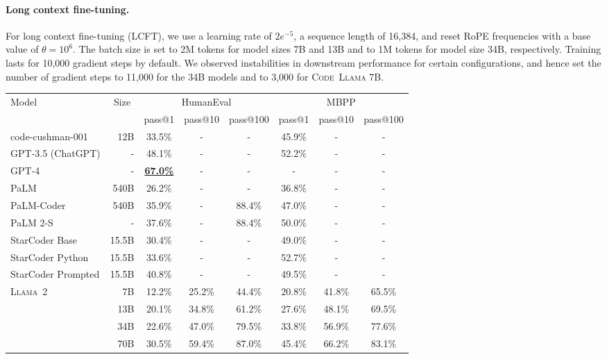 \documentclass[10pt]{article}
\newcommand{\model}{\textsc{Code~Llama}\xspace}
\newcommand{\llamavtwo}{\textsc{Llama~2}\xspace}
\newcommand*{\acc}[1]{\num[round-mode=places,round-precision=1]{#1}\%}
\begin{document}
\paragraph{Long context fine-tuning.}
For long context fine-tuning (LCFT), we use a learning rate of $2e^{-5}$, a sequence length of 16,384, and reset RoPE frequencies with a base value of $\theta=10^6$.
The batch size is set to 2M tokens for model sizes 7B and 13B and to 1M tokens for model size 34B, respectively.
Training lasts for 10,000 gradient steps by default.
We observed instabilities in downstream performance for certain configurations, and hence set the number of gradient steps to 11,000 for the 34B models and to 3,000 for \model7B.

\begin{table}[t!]
  \center
   \setlength{\tabcolsep}{3pt}
  \begin{tabular}{lr|ccc|ccc} \toprule
  Model &\multicolumn{1}{c}{Size}& \multicolumn{3}{c}{HumanEval} & \multicolumn{3}{c}{MBPP} \\&& pass@1 & pass@10 & pass@100 & pass@1 & pass@10 & pass@100 \\\midrule 
  code-cushman-001 &12B & \acc{33.5} & - & - & \acc{45.9} & - & -\\ 
  GPT-3.5 (ChatGPT) &-& \acc{48.1} & - & - & \acc{52.2} & - & - \\
  GPT-4 &-& \bf{\underline{\acc{67.0}}} & - & - & - & - & - \\
  PaLM &540B& \acc{26.2} & - & - & \acc{36.8} & - & -\\
  PaLM-Coder &540B& \acc{35.9} & - & \acc{88.4} & \acc{47.0} & - & - \\
  PaLM 2-S & - & \acc{37.6} & - & \acc{88.4} & \acc{50.0} & - & - \\ 
  StarCoder Base &15.5B & \acc{30.4} & - & - & \acc{49.0} & - & - \\
  StarCoder Python &15.5B & \acc{33.6} & - & - & \acc{52.7} & - & - \\
  StarCoder Prompted & 15.5B & \acc{40.8} & - & - & \acc{49.5} & - & - \\
  \midrule
  \multirow{ 4}{*}{\llamavtwo} 
  & 7B  & \acc{12.2}  & \acc{25.2}& \acc{44.4} & \acc{20.8} &\acc{41.8} & \acc{65.5}\\
  &13B  & \acc{20.1}  &\acc{34.8} & \acc{61.2} & \acc{27.6}&\acc{48.1}& \acc{69.5}\\
  &34B  & \acc{22.6}  &\acc{47.0} & \acc{79.5} & \acc{33.8}&\acc{56.9}& \acc{77.6}\\
  &70B  &  \acc{30.5} &\acc{59.4} & \acc{87.0} &\acc{45.4} &\acc{66.2}& \acc{83.1}\\

\end{tabular}
\end{table}
\end{document}
